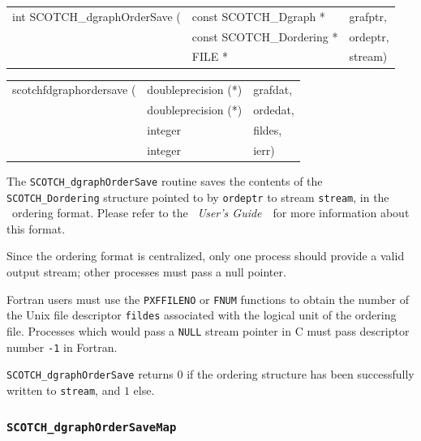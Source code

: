 \begin{itemize}
\progsyn

{\tt\begin{tabular}{l@{}ll}
int SCOTCH\_dgraphOrderSave ( & const SCOTCH\_Dgraph *    & grafptr, \\
                              & const SCOTCH\_Dordering * & ordeptr, \\
                              & FILE *                    & stream)
\end{tabular}}

{\tt\begin{tabular}{l@{}ll}
scotchfdgraphordersave ( & doubleprecision (*) & grafdat, \\
                         & doubleprecision (*) & ordedat, \\
                         & integer             & fildes,  \\
                         & integer             & ierr)
\end{tabular}}

\progdes

The {\tt SCOTCH\_dgraphOrderSave} routine saves the contents of the {\tt
SCOTCH\_\lbt Dordering} structure pointed to by {\tt ordeptr} to stream
{\tt stream}, in the \scotch\ ordering format. Please refer to the
{\it\scotch\ User's Guide}~\scotchcitesuser\ for more information about
this format.

Since the ordering format is centralized, only one process should
provide a valid output stream; other processes must pass a null
pointer.

Fortran users must use the {\tt PXFFILENO} or {\tt FNUM} functions to
obtain the number of the Unix file descriptor {\tt fildes} associated
with the logical unit of the ordering file. Processes which would pass
a {\tt NULL} stream pointer in C must pass descriptor number {\tt -1}
in Fortran.

\progret

{\tt SCOTCH\_dgraphOrderSave} returns $0$ if the ordering structure
has been successfully written to {\tt stream}, and $1$ else.
\end{itemize}

\subsubsection{{\tt SCOTCH\_dgraphOrderSaveMap}}

